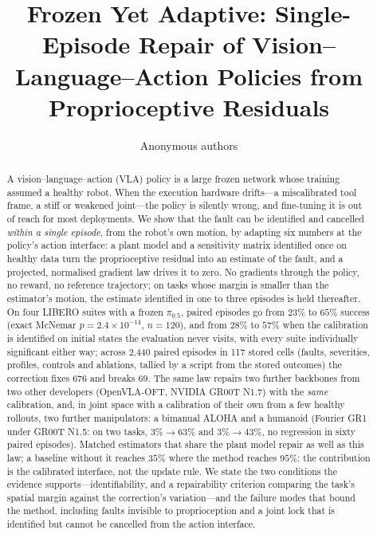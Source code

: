\documentclass{article}
\title{Frozen Yet Adaptive: Single-Episode Repair of Vision--Language--Action Policies from Proprioceptive Residuals}
\author{Anonymous authors}
\begin{document}
\maketitle

\begin{abstract}
A vision--language--action (VLA) policy is a large frozen network whose training assumed a
healthy robot. When the execution hardware drifts---a miscalibrated tool frame, a stiff or
weakened joint---the policy is silently wrong, and fine-tuning it is out of reach for most
deployments. We show that the fault can be identified and cancelled \emph{within a single
episode}, from the robot's own motion, by adapting six numbers at the policy's action
interface: a plant model and a sensitivity matrix identified once on healthy data turn the
proprioceptive residual into an estimate of the fault, and a projected, normalised gradient
law drives it to zero. No gradients through the policy, no reward, no reference trajectory;
on tasks whose margin is smaller than the estimator's motion, the estimate identified in one
to three episodes is held thereafter. On four LIBERO suites with a frozen $\pi_{0.5}$, paired
episodes go from $23\%$ to $65\%$ success (exact McNemar $p = 2.4\times10^{-14}$, $n=120$), and
from $28\%$ to $57\%$ when the calibration is identified on initial states the evaluation never
visits, with every suite individually significant either way; across 2,440 paired episodes in 117 stored cells
(faults, severities, profiles, controls and ablations, tallied by a script from the stored
outcomes) the correction fixes 676 and breaks 69. The same law repairs two further backbones from two other developers (OpenVLA-OFT,
NVIDIA GR00T N1.7) with the \emph{same} calibration, and, in joint space with a calibration
of their own from a few healthy rollouts, two further manipulators: a bimanual ALOHA and a
humanoid (Fourier GR1 under GR00T N1.5: on two tasks, $3\%\to63\%$ and $3\%\to43\%$, no
regression in sixty paired episodes). Matched estimators that share the plant model repair
as well as this law; a baseline without it reaches $35\%$ where the method reaches $95\%$:
the contribution is the calibrated interface, not the update rule. We state the
two conditions the evidence supports---identifiability, and a repairability criterion
comparing the task's spatial margin against the correction's variation---and the failure
modes that bound the method, including faults invisible to proprioception and a joint lock
that is identified but cannot be cancelled from the action interface.
\end{abstract}
\end{document}
